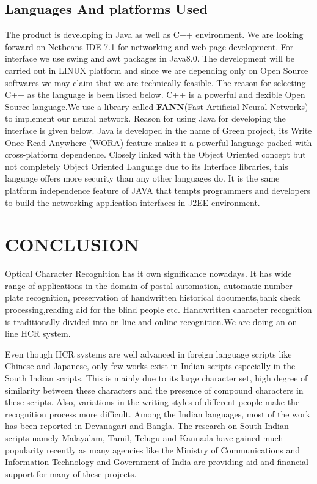 \documentclass[12pt,a4paper,oneside]{report}
\begin{document}
 \section{Languages And platforms Used}
The product is developing in Java as well as C++ environment. We are looking forward on Netbeans IDE 7.1 for networking and web page development. For interface we use swing and awt packages in Java8.0. The development will be carried out in LINUX platform and since we are depending only on Open Source softwares we may claim that we are technically feasible. The reason for selecting C++ as the language is been listed below.
	C++ is a powerful and flexible Open Source language.We use a library called
	\textbf{FANN}(Fast Artificial Neural Networks) to implement our neural network. 
Reason for using Java for developing the interface is given below.
Java is developed in the name of Green project, its Write Once Read Anywhere (WORA) feature makes it a powerful language packed with cross-platform dependence. Closely linked with the Object Oriented concept but not completely Object Oriented Language due to its Interface libraries, this language offers more security than any other languages do. It is the same platform independence feature of JAVA that tempts programmers and developers to build the networking application interfaces in J2EE environment.

\chapter{CONCLUSION}
Optical Character Recognition has it own significance nowadays. It has wide range of applications in the domain of postal automation, automatic number plate recognition,
preservation of handwritten historical documents,bank check processing,reading aid for the blind people
etc. Handwritten character recognition is traditionally divided into on-line and online recognition.We
are doing an on-line HCR system. 
\par  Even though HCR systems are well advanced in foreign language
scripts like Chinese and Japanese, only few works exist in Indian scripts especially in the South Indian
scripts. This is mainly due to its large character set, high degree of similarity between these characters
and the presence of compound characters in these scripts. Also, variations in the writing styles of different
people make the recognition process more difficult. Among the Indian languages, most of the work has
been reported in Devanagari and Bangla. The research on South Indian scripts namely Malayalam,
Tamil, Telugu and Kannada have gained much popularity recently as many agencies like the Ministry
of Communications and Information Technology and Government of India are providing aid and financial
support for many of these projects.
\end{document}
